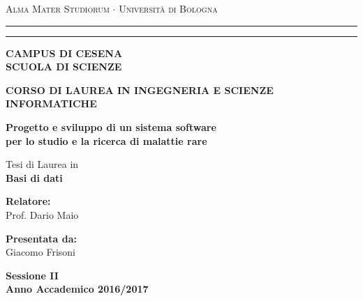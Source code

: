 \documentclass[12pt,a4paper]{article}
\begin{document}
\begin{titlepage}
\begin{center}
{{\Large{\textsc{Alma Mater Studiorum $\cdot$ Universit\`a di
Bologna}}}} \rule[0.1cm]{15.8cm}{0.1mm}
\rule[0.5cm]{15.8cm}{0.6mm}
{\small{\bf CAMPUS DI CESENA\\SCUOLA DI SCIENZE }}
\end{center}
\vspace{3mm}
\begin{center}
{\small{\bf CORSO DI LAUREA IN INGEGNERIA E SCIENZE INFORMATICHE}}
\end{center}
\vspace{30mm}
\begin{center}
{\LARGE{\bf Progetto e sviluppo di un sistema software}}\\
\vspace{3mm}
{\LARGE{\bf per lo studio e la ricerca di malattie rare}}\\
\end{center}
\vspace{30mm}
\begin{center}
{\large Tesi di Laurea in\\
{\bf Basi di dati}}
\end{center}
\vspace{15mm}
\par
\noindent
\begin{minipage}[t]{0.47\textwidth}
{\large{\bf Relatore:}\\
Prof. Dario Maio}
\end{minipage}
\hfill
\begin{minipage}[t]{0.47\textwidth}\raggedleft
{\large{\bf Presentata da:}\\
Giacomo Frisoni}
\end{minipage}
\vspace{30mm}
\begin{center}
{\large{\bf Sessione II\\
Anno Accademico 2016/2017}}
\end{center}
\end{titlepage}
\end{document}
